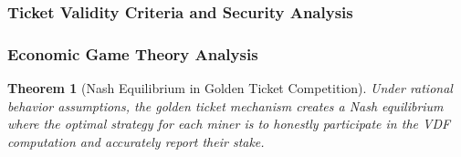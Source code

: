 \documentclass[11pt,a4paper]{article}
\newtheorem{theorem}{Theorem}[section]
\begin{document}
\subsubsection{Ticket Validity Criteria and Security Analysis}

\begin{algorithm}[H]
\SetAlgoLined
{}
\caption{Comprehensive Ticket Validation}







\;
\end{algorithm}

\subsubsection{Economic Game Theory Analysis}

\begin{theorem}[Nash Equilibrium in Golden Ticket Competition]
Under rational behavior assumptions, the golden ticket mechanism creates a Nash equilibrium where the optimal strategy for each miner is to honestly participate in the VDF computation and accurately report their stake.
\end{theorem}
\end{document}
